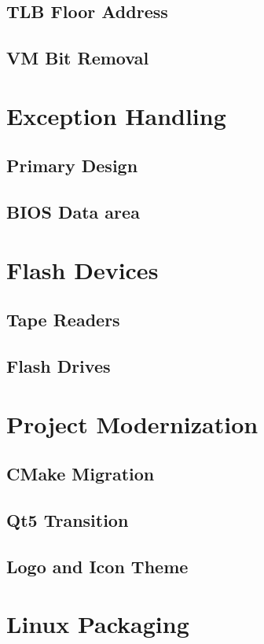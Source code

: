 \documentclass[12pt,a4paper,openright,twoside]{report}
\begin{document}
\section{TLB Floor Address}
\section{VM Bit Removal}
\chapter{Exception Handling}
\lhead[\fancyplain{}{\bfseries\thepage}]{\fancyplain{}{\bfseries\rightmark}}
\section{Primary Design}
\section{BIOS Data area}
\lhead[\fancyplain{}{\bfseries\thepage}]{\fancyplain{}{\bfseries\rightmark}}
\chapter{Flash Devices}
\lhead[\fancyplain{}{\bfseries\thepage}]{\fancyplain{}{\bfseries\rightmark}}
\section{Tape Readers}
\section{Flash Drives}
\chapter{Project Modernization}
\lhead[\fancyplain{}{\bfseries\thepage}]{\fancyplain{}{\bfseries\rightmark}}
\section{CMake Migration}
\section{Qt5 Transition}
\section{Logo and Icon Theme}
\chapter{Linux Packaging}
\lhead[\fancyplain{}{\bfseries\thepage}]{\fancyplain{}{\bfseries\rightmark}}
\end{document}
